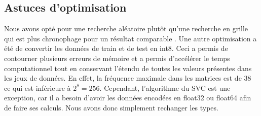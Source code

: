 \documentclass{article}
\begin{document}
\subsection{Astuces d'optimisation}
Nous avons opté pour une recherche aléatoire plutôt qu'une recherche en grille qui est plus chronophage pour un résultat comparable \cite{bergstra2012random}. Une autre optimisation a été de convertir les données de train et de test en int8. Ceci a permis de contourner plusieurs erreurs de mémoire et a permis d'accélérer le temps computationnel tout en conservant l'étendu de toutes les valeurs présentes dans les jeux de données. En effet, la fréquence maximale dans les matrices est de 38 ce qui est inférieure à $2^8=256$. Cependant, l'algorithme du SVC est une exception, car il a besoin d'avoir les données encodées en float32 ou float64 afin de faire ses calculs. Nous avons donc simplement rechanger les types.
\end{document}
